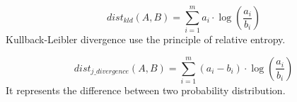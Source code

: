 \begin{definition}
  \begin{equation}
    dist_{kld}(A, B) = \sum_{i=1}^{m} a_i \cdot \log(\frac{a_i}{b_i})
  \end{equation}
  Kullback-Leibler divergence use the principle of relative entropy.
\end{definition}

\begin{definition}
  \begin{equation}
    dist_{j\_divergence}(A, B) = \sum_{i=1}^{m} (a_i - b_i) \cdot \log(\frac{a_i}{b_i})
  \end{equation}
  It represents the difference between two probability distribution.
\end{definition}

